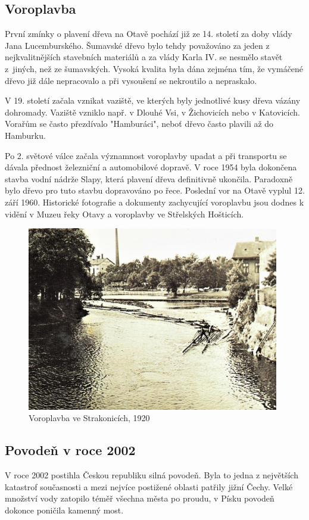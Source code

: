 \documentclass[thesis=M,czech]{FITthesis}[2012/06/26]
\begin{document}
\subsection{Voroplavba}
První zmínky o plavení dřeva na Otavě pochází již ze 14. století za doby vlády Jana Lucemburského. Šumavské dřevo bylo tehdy považováno za jeden z nejkvalitnějších stavebních materiálů a za vlády Karla IV. se nesmělo stavět z~jiných, než ze šumavských. Vysoká kvalita byla dána zejména tím, že vymáčené dřevo již dále nepracovalo a při vysoušení se nekroutilo a nepraskalo. 

V 19. století začala vznikat vaziště, ve kterých byly jednotlivé kusy dřeva vázány dohromady. Vaziště vzniklo např. v Dlouhé Vsi, v Žichovicích nebo v Katovicích. Vorařům se často přezdívalo "Hamburáci", neboť dřevo často plavili až do Hamburku. 

Po 2. světové válce začala významnost voroplavby upadat a při transportu se dávala přednost železniční a automobilové dopravě. V roce 1954 byla dokončena stavba vodní nádrže Slapy, která plavení dřeva definitivně ukončila. Paradoxně bylo dřevo pro tuto stavbu dopravováno po řece. Poslední vor na Otavě vyplul 12. září 1960. Historické fotografie a dokumenty zachycující voroplavbu jsou dodnes k vidění v Muzeu řeky Otavy a voroplavby ve Střelských Hošticích. 
\clearpage
\begin{figure}[h!]
	\centering
	\includegraphics[width=11cm]{pics/voroplavba.jpg}
	\caption{Voroplavba ve Strakonicích, 1920}
	\label{obrazek:voroplavba}
\end{figure}


\subsection{Povodeň v roce 2002}
V roce 2002 postihla Českou republiku silná povodeň. Byla to jedna z největších katastrof současnosti a mezi nejvíce postižené oblasti patřily jižní Čechy. Velké množství vody zatopilo téměř všechna města po proudu, v Písku povodeň dokonce poničila kamenný most. 
\end{document}
